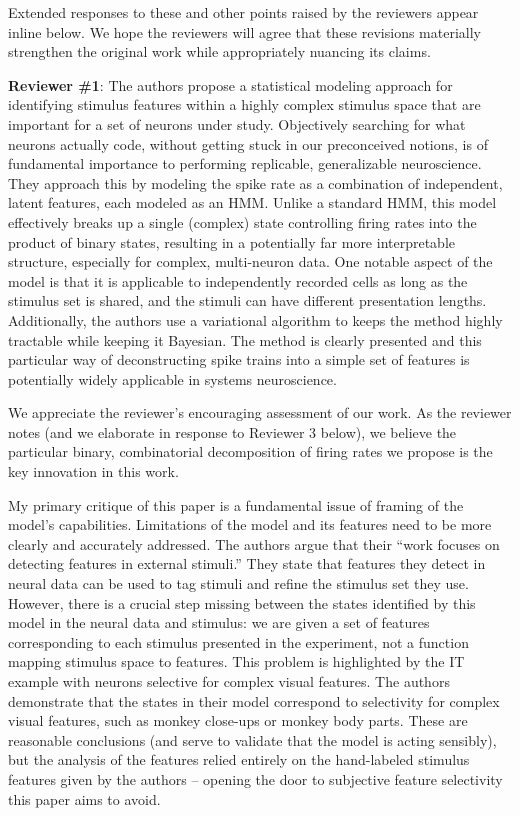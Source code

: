\documentclass[12pt,a4paper]{article}
\newcommand{\edit}[1]{\textcolor{edit}{#1}}
\begin{document}
\edit{
Extended responses to these and other points raised by the reviewers appear inline below. We hope the reviewers will agree that these revisions {\color{red}{and new analyses}} materially strengthen the original work while appropriately nuancing its claims.
}

{\bf Reviewer \#1}: The authors propose a statistical modeling approach for identifying stimulus features within a highly complex stimulus space that are important for a set of neurons under study. Objectively searching for what neurons actually code, without getting stuck in our preconceived notions, is of fundamental importance to performing replicable, generalizable neuroscience. They approach this by modeling the spike rate as a combination of independent, latent features, each modeled as an HMM. Unlike a standard HMM, this model effectively breaks up a single (complex) state controlling firing rates into the product of binary states, resulting in a potentially far more interpretable structure, especially for complex, multi-neuron data. One notable aspect of the model is that it is applicable to independently recorded cells as long as the stimulus set is shared, and the stimuli can have different presentation lengths. Additionally, the authors use a variational algorithm to keeps the method highly tractable while keeping it Bayesian. The method is clearly presented and this particular way of deconstructing spike trains into a simple set of features is potentially widely applicable in systems neuroscience.

\edit{We appreciate the reviewer's encouraging assessment of our work. As the reviewer notes (and we elaborate in response to Reviewer 3 below), we believe the particular binary, combinatorial decomposition of firing rates we propose is the key innovation in this work.}

My primary critique of this paper is a fundamental issue of framing of the model’s capabilities. Limitations of the model and its features need to be more clearly and accurately addressed. The authors argue that their “work focuses on detecting features in external stimuli.” They state that features they detect in neural data can be used to tag stimuli and refine the stimulus set they use. However, there is a crucial step missing between the states identified by this model in the neural data and stimulus: we are given a set of features corresponding to each stimulus presented in the experiment, not a function mapping stimulus space to features. This problem is highlighted by the IT example with neurons selective for complex visual features. The authors demonstrate that the states in their model correspond to selectivity for complex visual features, such as monkey close-ups or monkey body parts. These are reasonable conclusions (and serve to validate that the model is acting sensibly), but the analysis of the features relied entirely on the hand-labeled stimulus features given by the authors – opening the door to subjective feature selectivity this paper aims to avoid.
\end{document}
